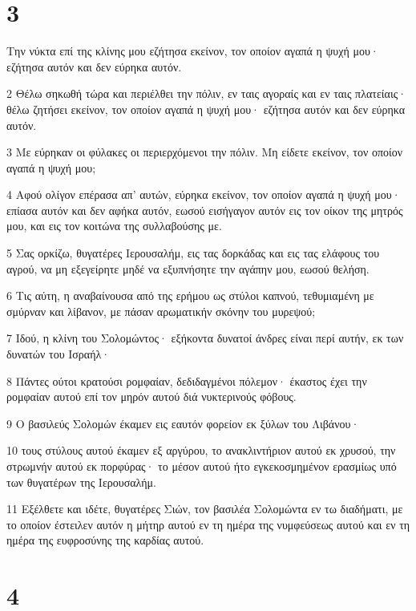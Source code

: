 \chapter{3}

\par Την νύκτα επί της κλίνης μου εζήτησα εκείνον, τον οποίον αγαπά η ψυχή μου· εζήτησα αυτόν και δεν εύρηκα αυτόν.
\par 2 Θέλω σηκωθή τώρα και περιέλθει την πόλιν, εν ταις αγοραίς και εν ταις πλατείαις· θέλω ζητήσει εκείνον, τον οποίον αγαπά η ψυχή μου· εζήτησα αυτόν και δεν εύρηκα αυτόν.
\par 3 Με εύρηκαν οι φύλακες οι περιερχόμενοι την πόλιν. Μη είδετε εκείνον, τον οποίον αγαπά η ψυχή μου;
\par 4 Αφού ολίγον επέρασα απ' αυτών, εύρηκα εκείνον, τον οποίον αγαπά η ψυχή μου· επίασα αυτόν και δεν αφήκα αυτόν, εωσού εισήγαγον αυτόν εις τον οίκον της μητρός μου, και εις τον κοιτώνα της συλλαβούσης με.
\par 5 Σας ορκίζω, θυγατέρες Ιερουσαλήμ, εις τας δορκάδας και εις τας ελάφους του αγρού, να μη εξεγείρητε μηδέ να εξυπνήσητε την αγάπην μου, εωσού θελήση.
\par 6 Τις αύτη, η αναβαίνουσα από της ερήμου ως στύλοι καπνού, τεθυμιαμένη με σμύρναν και λίβανον, με πάσαν αρωματικήν σκόνην του μυρεψού;
\par 7 Ιδού, η κλίνη του Σολομώντος· εξήκοντα δυνατοί άνδρες είναι περί αυτήν, εκ των δυνατών του Ισραήλ·
\par 8 Πάντες ούτοι κρατούσι ρομφαίαν, δεδιδαγμένοι πόλεμον· έκαστος έχει την ρομφαίαν αυτού επί τον μηρόν αυτού διά νυκτερινούς φόβους.
\par 9 Ο βασιλεύς Σολομών έκαμεν εις εαυτόν φορείον εκ ξύλων του Λιβάνου·
\par 10 τους στύλους αυτού έκαμεν εξ αργύρου, το ανακλιντήριον αυτού εκ χρυσού, την στρωμνήν αυτού εκ πορφύρας· το μέσον αυτού ήτο εγκεκοσμημένον ερασμίως υπό των θυγατέρων της Ιερουσαλήμ.
\par 11 Εξέλθετε και ιδέτε, θυγατέρες Σιών, τον βασιλέα Σολομώντα εν τω διαδήματι, με το οποίον έστειλεν αυτόν η μήτηρ αυτού εν τη ημέρα της νυμφεύσεως αυτού και εν τη ημέρα της ευφροσύνης της καρδίας αυτού.

\chapter{4}

